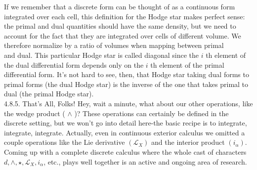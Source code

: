 \documentclass[10pt]{article}
\begin{document}
If we remember that a discrete form can be thought of as a continuous form integrated over each cell, this definition for the Hodge star makes perfect sense: the primal and dual quantities should have the same density, but we need to account for the fact that they are integrated over cells of different volume. We therefore normalize by a ratio of volumes when mapping between primal\\
and dual. This particular Hodge star is called diagonal since the $i$ th element of the dual differential form depends only on the $i$ th element of the primal differential form. It's not hard to see, then, that Hodge star taking dual forms to primal forms (the dual Hodge star) is the inverse of the one that takes primal to dual (the primal Hodge star).\\
4.8.5. That's All, Folks! Hey, wait a minute, what about our other operations, like the wedge product ( $\wedge$ )? These operations can certainly be defined in the discrete setting, but we won't go into detail here-the basic recipe is to integrate, integrate, integrate. Actually, even in continuous exterior calculus we omitted a couple operations like the Lie derivative $\left(\mathcal{L}_{X}\right)$ and the interior product $\left(i_{\alpha}\right)$. Coming up with a complete discrete calculus where the whole cast of characters $d, \wedge, \star, \mathcal{L}_{X}, i_{\alpha}$, etc., plays well together is an active and ongoing area of research.
\end{document}
